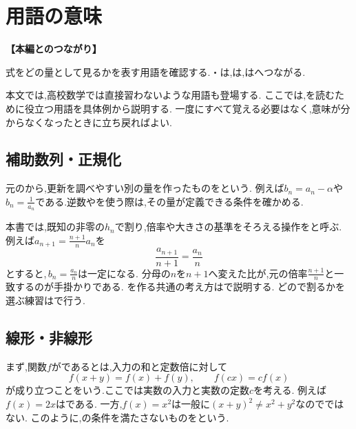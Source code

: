 
\section{用語の意味}\label{節：用語解説}
  \noindent\textbf{【本編とのつながり】}\par
  式をどの量として見るかを表す用語を確認する.・は,は,はへつながる.

  本文では,高校数学では直接習わないような用語も登場する.
  ここでは,を読むために役立つ用語を具体例から説明する.
  一度にすべて覚える必要はなく,意味が分からなくなったときに立ち戻ればよい.

  \subsection{補助数列・正規化}\label{節：補助数列・正規化}
    元のから,更新を調べやすい別の量を作ったものを\textbf{}という.
    例えば$b_n=a_n-\alpha$や$b_n=\frac1{a_n}$である.逆数やを使う際は,その量が定義できる条件を確かめる.

    本書では,既知の非零の$h_n$で割り,倍率や大きさの基準をそろえる操作を\textbf{}と呼ぶ.
    例えば$a_{n+1}=\frac{n+1}{n}a_n$を
    \[
      \frac{a_{n+1}}{n+1}=\frac{a_n}{n}
    \]
    とすると,\,$b_n=\frac{a_n}{n}$は一定になる.
    分母の$n$を$n+1$へ変えた比が,元の倍率$\frac{n+1}{n}$と一致するのが手掛かりである.
    を作る共通の考え方はで説明する.
    どので割るかを選ぶ練習はで行う.

  \subsection{線形・非線形}\label{節：線形・非線形}
    まず,関数$f$が\textbf{}であるとは,入力の和と定数倍に対して
    \[
      f(x+y)=f(x)+f(y),\qquad
      f(cx)=cf(x)
    \]
    が成り立つことをいう.ここでは実数の入力と実数の定数$c$を考える.
    例えば$f(x)=2x$はである.
    一方,$f(x)=x^2$は一般に$(x+y)^2\ne x^2+y^2$なのでではない.
    このように,の条件を満たさないものを\textbf{}という.

